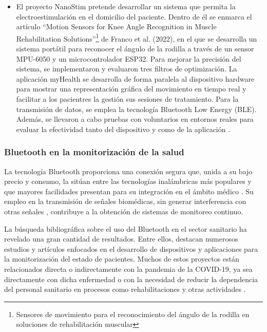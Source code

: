 \begin{itemize}
    \item El proyecto NanoStim pretende desarrollar un sistema que permita la electroestimulación en el domicilio del paciente. Dentro de él se enmarca el artículo ``Motion Sensors for Knee Angle Recognition in Muscle Rehabilitation Solutions''\footnote{Sensores de movimiento para el reconocimiento del ángulo de la rodilla en soluciones de rehabilitación muscular} de Franco et al. (2022), en el que se desarrolla un sistema portátil para reconocer el ángulo de la rodilla a través de un sensor MPU-6050 y un microcontrolador ESP32. Para mejorar la precisión del sistema, se implementaron y evaluaron tres filtros de optimización. La aplicación myHealth se desarrolla de forma paralela al dispositivo hardware para mostrar una representación gráfica del movimiento en tiempo real y facilitar a los pacientres la gestión sus sesiones de tratamiento. Para la transmisión de datos, se emplea la tecnología Bluetooth Low Energy (BLE). Además, se llevaron a cabo pruebas con voluntarios en entornos reales para evaluar la efectividad tanto del dispositivo y como de la aplicación \cite{SensorRodilla}.
\end{itemize}


\subsubsection{Bluetooth en la monitorización de la salud}
La tecnología Bluetooth proporciona una conexión segura que, unida a su bajo precio y consumo, la sitúan entre las tecnologías inalámbricas más populares \cite{zubiete2011review} y que mayores facilidades presentan para su integración en el ámbito médico \cite{francosistemas}. Su empleo en la transmisión de señales biomédicas, sin generar interferencia con otras señales \cite{carranza2011patient}, contribuye a la obtención de sistemas de monitoreo continuo. 

La búsqueda bibliográfica sobre el uso del Bluetooth en el sector sanitario ha revelado una gran cantidad de resultados. Entre ellos, destacan numerosos estudios y artículos enfocados en el desarrollo de dispositivos y aplicaciones para la monitorización del estado de pacientes. Muchos de estos proyectos están relacionados directa o indirectamente con la pandemia de la COVID-19, ya sea directamente con dicha enfermedad o con la necesidad de reducir la dependencia del personal sanitario en procesos como rehabilitaciones y otras actividades \cite{leibold2023smartphone}.

